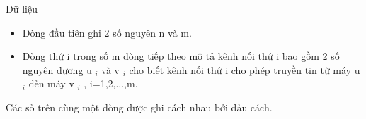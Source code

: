 Dữ liệu
\begin{itemize}
	\item     Dòng đầu tiên ghi 2 số nguyên n và m.   
	\item     Dòng thứ i trong số m dòng tiếp theo mô tả kênh nối thứ i bao gồm 2 số nguyên dương u    $_     i    $    và v    $_     i    $    cho biết kênh nối thứ i cho phép truyền tin từ máy u    $_     i    $    đến máy v    $_     i    $    , i=1,2,...,m.   
\end{itemize}

   Các số trên cùng một dòng được ghi cách nhau bởi dấu cách.